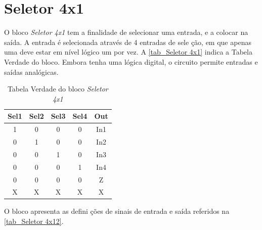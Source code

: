 \renewcommand{\NomeBloco}{\emph{Seletor 4x1}}
\renewcommand{\NomeBlocoNoIt}{Seletor 4x1}
\renewcommand{\NomePTab}{tab_\NomeBlocoNoIt}
\renewcommand{\NomeSTab}{tab_\NomeBlocoNoIt2}
\renewcommand{\NomePFig}{fig_\NomeBlocoNoIt}
\renewcommand{\NomeSFig}{fig_\NomeBlocoNoIt2}
\renewcommand{\NomeTTab}{tab_\NomeBlocoNoIt3}

\section{Seletor 4x1}

O bloco \NomeBloco{} tem a finalidade de selecionar uma entrada, e a colocar na sa\'ida. A entrada \'e selecionada atrav\'es de 4 entradas de sele ção, em que apenas uma deve estar em n\'ivel l\'ogico um por vez. A \autoref{\NomePTab} indica a Tabela Verdade do bloco. Embora tenha uma l\'ogica digital, o circuito permite entradas e sa\'idas anal\'ogicas.

\begin{table}[htbp]

\caption{Tabela Verdade do bloco \NomeBloco}%
\label{\NomePTab}
\centering
\begin{tabular}{ccccc}
    \toprule
    Sel1 & Sel2 & Sel3 & Sel4 & Out \\
    \midrule \midrule
    1 & 0 & 0 & 0 & In1 \\
    \midrule
    0 & 1 & 0 & 0 & In2 \\
    \midrule
    0 & 0 & 1 & 0 & In3 \\
    \midrule
    0 & 0 & 0 & 1 & In4 \\
    \midrule
    0 & 0 & 0 & 0 & Z \\
    \midrule
    X & X & X & X & X \\
\bottomrule

\end{tabular}
\end{table}

O bloco apresenta as defini ções de sinais de entrada e sa\'ida referidos na \autoref{\NomeSTab}.

